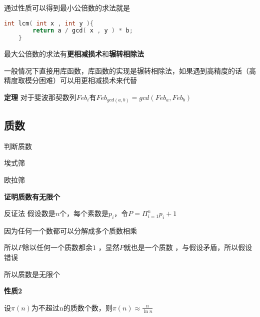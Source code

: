 通过性质可以得到最小公倍数的求法就是
\begin{lstlisting}[language = c]
    int lcm( int x , int y ){
        return a / gcd( x , y ) * b;
    }
\end{lstlisting}
最大公倍数的求法有\textbf{更相减损术}和\textbf{辗转相除法}



一般情况下直接用库函数，库函数的实现是辗转相除法，如果遇到高精度的话（高精度取模分困难）可以用更相减损术来代替

\textbf{定理} 对于斐波那契数列$Feb_i$有$Feb_{gcd(a,b)}=gcd(Feb_a , Feb_b)$

\subsection{质数}
判断质数

埃式筛

欧拉筛


\textbf{证明质数有无限个}

反证法 假设数是$n$个，每个素数是$p_i$，令$P = \Pi_{i=1}^{n} p_i + 1$

因为任何一个数都可以分解成多个质数相乘

所以$P$除以任何一个质数都余$1$ ，显然$P$就也是一个质数 ，与假设矛盾，所以假设错误

所以质数是无限个

\textbf{性质2}

设$\pi(n)$为不超过n的质数个数，则$\pi(n) \approx \frac{n}{\ln{n}}$





